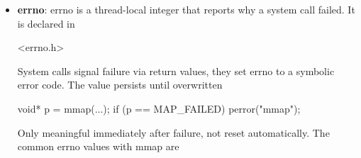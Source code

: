 \documentclass{report}
\begin{document}
\begin{itemize}
            \begin{itemize}
                \item \textbf{RW:} Write code
                \item \textbf{RX:} Execute code
            \end{itemize}
            This is critical for enforcing $W \oplus X$ (write xor execute) security.
            \bigbreak \noindent 
            The protection flags (prot) are
            \begin{itemize}
                \item \textbf{PROT\_READ}: Readable
                \item \textbf{PROT\_WRITE}: Writable
                \item \textbf{PROT\_EXEC}: Executable
                \item \textbf{PROT\_NONE}: No access
            \end{itemize}
            These specify what the CPU is allowed to do with the memory
            \bigbreak \noindent 
            The mapping flags (flags) are
            \begin{itemize}
                \item \textbf{MAP\_PRIVATE}: Copy-on-write
                \item \textbf{MAP\_SHARED}: Shared between processes
                \item \textbf{MAP\_ANONYMOUS}: Not backed by a file
                \item \textbf{MAP\_FIXED}: Place mapping at a fixed address (dangerous)
            \end{itemize}
        \item \textbf{errno}: errno is a thread-local integer that reports why a system call failed. It is declared in 
            \bigbreak \noindent 
            \begin{cppcode}
                <errno.h>
            \end{cppcode}
            \bigbreak \noindent 
            System calls signal failure via return values, they set errno to a symbolic error code. The value persists until overwritten
            \bigbreak \noindent 
            \begin{cppcode}
                void* p = mmap(...);
                if (p == MAP_FAILED) {
                    perror("mmap");
                }
            \end{cppcode}
            \bigbreak \noindent 
            Only meaningful immediately after failure, not reset automatically. The common errno values with mmap are

\end{itemize}
\end{document}
